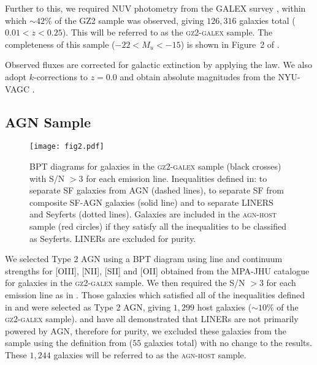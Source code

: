 \documentclass[useAMS,usenatbib]{mn2e}
\def\changed    {\color{nc} }
\begin{document}
Further to this, we required NUV photometry from the GALEX survey \citep{Martin05}, within which $\sim42\%$ of the GZ2 sample was observed, giving $126, 316$ galaxies total ($0.01 < z < 0.25$). This will be referred to as the \textsc{gz2-galex} sample. The completeness of this sample ($-22 < M_u < -15$) is shown in Figure~2 of \cite{Sme2015}. 

{\changed Observed fluxes are corrected for galactic extinction \citep{Oh11} by applying the \citet*{Cardelli89} law. We also adopt $k$-corrections to $z = 0.0$ and obtain absolute magnitudes from the NYU-VAGC \citep{Blanton05, Pad08, BR07}.}

\subsection{AGN Sample}\label{agnsample}

\begin{figure*}
\texttt{[image: fig2.pdf]}
\caption{BPT diagrams for galaxies in the \textsc{gz2-galex} sample (black crosses) with S/N $> 3$ for each emission line. Inequalities defined in: \protect\cite{Kew01} to separate SF galaxies from AGN (dashed lines), \protect\cite{Kauff03b} to separate SF from composite SF-AGN galaxies (solid line) and \protect\cite{Kew06} to separate LINERS and Seyferts (dotted lines). Galaxies are included in the \textsc{agn-host} sample (red circles) if they satisfy all the inequalities to be classified as Seyferts. LINERs are excluded for purity.}
\label{bpt}
\end{figure*}

We selected Type 2 AGN using a BPT diagram \citep{bpt81} using line and continuum strengths for [OIII], [NII], [SII] and [OII] obtained from the MPA-JHU catalogue \citep{Kauff03, Brinch04} for galaxies in the \textsc{gz2-galex} sample. We then required the S/N $> 3$ for each emission line as in \cite{Sch2010}. Those galaxies which satisfied all of the inequalities defined in \cite{Kew01} and \cite{Kauff03b} were selected as Type 2 AGN, giving $1,299$ host galaxies ($\sim10\%$ of the \textsc{gz2-galex} sample). \cite{Sarzi10, RB12} and \cite{Singh13} have all demonstrated that LINERs are not primarily powered by AGN, therefore for purity, we excluded these galaxies from the sample using the definition from \cite{Kew06} ($55$ galaxies total) with no change to the results. These $1,244$ galaxies will be referred to as the \textsc{agn-host} sample. 
\end{document}
